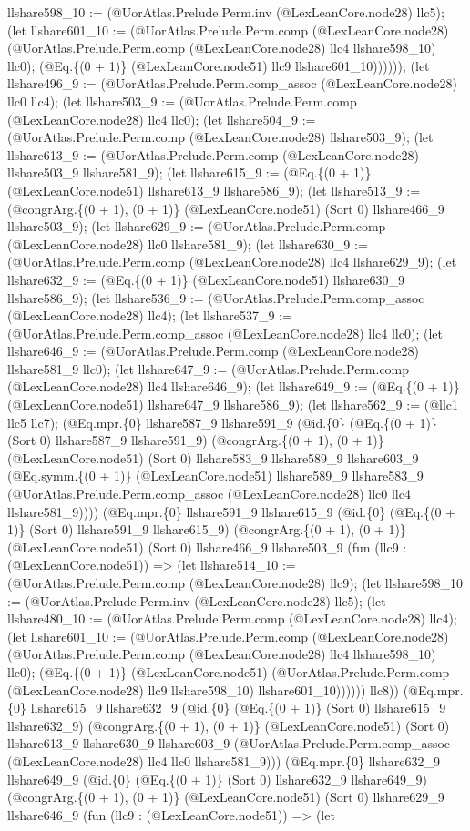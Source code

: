 \documentclass[11pt]{article}
\begin{document}
llshare598\_10 := (@UorAtlas.Prelude.Perm.inv (@LexLeanCore.node28) llc5); (let llshare601\_10 := (@UorAtlas.Prelude.Perm.comp (@LexLeanCore.node28) (@UorAtlas.Prelude.Perm.comp (@LexLeanCore.node28) llc4 llshare598\_10) llc0); (@Eq.\{(0 + 1)\} (@LexLeanCore.node51) llc9 llshare601\_10)))))); (let llshare496\_9 := (@UorAtlas.Prelude.Perm.comp\_assoc (@LexLeanCore.node28) llc0 llc4); (let llshare503\_9 := (@UorAtlas.Prelude.Perm.comp (@LexLeanCore.node28) llc4 llc0); (let llshare504\_9 := (@UorAtlas.Prelude.Perm.comp (@LexLeanCore.node28) llshare503\_9); (let llshare613\_9 := (@UorAtlas.Prelude.Perm.comp (@LexLeanCore.node28) llshare503\_9 llshare581\_9); (let llshare615\_9 := (@Eq.\{(0 + 1)\} (@LexLeanCore.node51) llshare613\_9 llshare586\_9); (let llshare513\_9 := (@congrArg.\{(0 + 1), (0 + 1)\} (@LexLeanCore.node51) (Sort 0) llshare466\_9 llshare503\_9); (let llshare629\_9 := (@UorAtlas.Prelude.Perm.comp (@LexLeanCore.node28) llc0 llshare581\_9); (let llshare630\_9 := (@UorAtlas.Prelude.Perm.comp (@LexLeanCore.node28) llc4 llshare629\_9); (let llshare632\_9 := (@Eq.\{(0 + 1)\} (@LexLeanCore.node51) llshare630\_9 llshare586\_9); (let llshare536\_9 := (@UorAtlas.Prelude.Perm.comp\_assoc (@LexLeanCore.node28) llc4); (let llshare537\_9 := (@UorAtlas.Prelude.Perm.comp\_assoc (@LexLeanCore.node28) llc4 llc0); (let llshare646\_9 := (@UorAtlas.Prelude.Perm.comp (@LexLeanCore.node28) llshare581\_9 llc0); (let llshare647\_9 := (@UorAtlas.Prelude.Perm.comp (@LexLeanCore.node28) llc4 llshare646\_9); (let llshare649\_9 := (@Eq.\{(0 + 1)\} (@LexLeanCore.node51) llshare647\_9 llshare586\_9); (let llshare562\_9 := (@llc1 llc5 llc7); (@Eq.mpr.\{0\} llshare587\_9 llshare591\_9 (@id.\{0\} (@Eq.\{(0 + 1)\} (Sort 0) llshare587\_9 llshare591\_9) (@congrArg.\{(0 + 1), (0 + 1)\} (@LexLeanCore.node51) (Sort 0) llshare583\_9 llshare589\_9 llshare603\_9 (@Eq.symm.\{(0 + 1)\} (@LexLeanCore.node51) llshare589\_9 llshare583\_9 (@UorAtlas.Prelude.Perm.comp\_assoc (@LexLeanCore.node28) llc0 llc4 llshare581\_9)))) (@Eq.mpr.\{0\} llshare591\_9 llshare615\_9 (@id.\{0\} (@Eq.\{(0 + 1)\} (Sort 0) llshare591\_9 llshare615\_9) (@congrArg.\{(0 + 1), (0 + 1)\} (@LexLeanCore.node51) (Sort 0) llshare466\_9 llshare503\_9 (fun (llc9 : (@LexLeanCore.node51)) => (let llshare514\_10 := (@UorAtlas.Prelude.Perm.comp (@LexLeanCore.node28) llc9); (let llshare598\_10 := (@UorAtlas.Prelude.Perm.inv (@LexLeanCore.node28) llc5); (let llshare480\_10 := (@UorAtlas.Prelude.Perm.comp (@LexLeanCore.node28) llc4); (let llshare601\_10 := (@UorAtlas.Prelude.Perm.comp (@LexLeanCore.node28) (@UorAtlas.Prelude.Perm.comp (@LexLeanCore.node28) llc4 llshare598\_10) llc0); (@Eq.\{(0 + 1)\} (@LexLeanCore.node51) (@UorAtlas.Prelude.Perm.comp (@LexLeanCore.node28) llc9 llshare598\_10) llshare601\_10)))))) llc8)) (@Eq.mpr.\{0\} llshare615\_9 llshare632\_9 (@id.\{0\} (@Eq.\{(0 + 1)\} (Sort 0) llshare615\_9 llshare632\_9) (@congrArg.\{(0 + 1), (0 + 1)\} (@LexLeanCore.node51) (Sort 0) llshare613\_9 llshare630\_9 llshare603\_9 (@UorAtlas.Prelude.Perm.comp\_assoc (@LexLeanCore.node28) llc4 llc0 llshare581\_9))) (@Eq.mpr.\{0\} llshare632\_9 llshare649\_9 (@id.\{0\} (@Eq.\{(0 + 1)\} (Sort 0) llshare632\_9 llshare649\_9) (@congrArg.\{(0 + 1), (0 + 1)\} (@LexLeanCore.node51) (Sort 0) llshare629\_9 llshare646\_9 (fun (llc9 : (@LexLeanCore.node51)) => (let 
\end{document}
